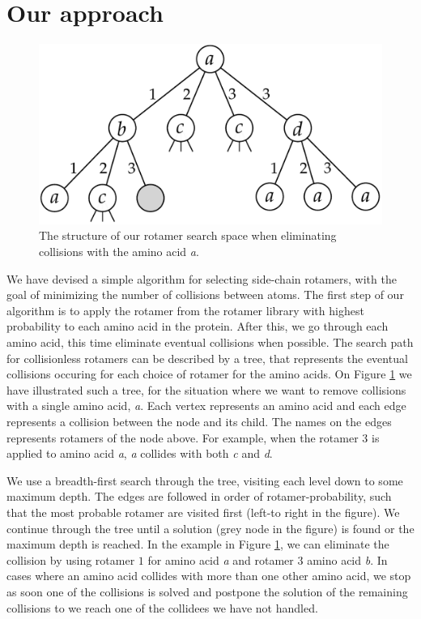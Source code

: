 \section{Our approach}
\begin{figure}
	\centering
	\includegraphics[width=.9\columnwidth]{figures/rotamersearch}
	\caption{The structure of our rotamer search space when eliminating
      collisions with the amino acid \textit{a}.}
    \label{fig:rotamer-search-tree}
\end{figure}
We have devised a simple algorithm for selecting side-chain rotamers,
with the goal of minimizing the number of collisions between
atoms. The first step of our algorithm is to apply the rotamer from the rotamer library
with highest probability to each amino acid in the protein. After
this, we go through each amino acid, this time eliminate
eventual collisions when possible. The search path for collisionless rotamers can be
described by a tree, that represents the eventual collisions occuring
for each choice of rotamer for the amino acids. On Figure
\ref{fig:rotamer-search-tree} we have illustrated such a tree, for the
situation where we want to remove collisions with a single amino acid,
\textit{a}. Each vertex represents an amino acid and each edge
represents a collision between the node and its child. The names on
the edges represents rotamers of the node above. For example, when
the rotamer $3$ is applied to amino acid \textit{a}, \textit{a} collides
with both \textit{c} and \textit{d}.

We use a breadth-first search through the tree, visiting each level
down to some maximum depth. The edges are followed in order of
rotamer-probability, such that the most probable rotamer are visited
first (left-to right in the figure). We continue through the tree
until a solution (grey node in the figure) is found or the maximum
depth is reached. In the example in Figure
\ref{fig:rotamer-search-tree}, we can eliminate the collision by using
rotamer $1$ for amino acid \textit{a} and rotamer $3$ amino acid
\textit{b}. In cases where an amino acid collides with more than one
other amino acid, we stop as soon one of the collisions is solved and
postpone the solution of the remaining collisions to we reach one of
the collidees we have not handled.

